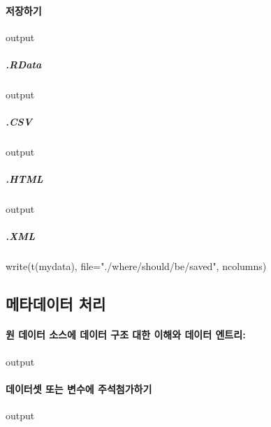 \documentclass{book}
\begin{document}
% 
\paragraph{저장하기}
\begin{Schunk}
\begin{Soutput}
output
\end{Soutput}
\end{Schunk}
\subparagraph{.RData}
\begin{Schunk}
\begin{Soutput}
output
\end{Soutput}
\end{Schunk}
\subparagraph{.CSV}
\begin{Schunk}
\begin{Soutput}
output
\end{Soutput}
\end{Schunk}
\subparagraph{.HTML}
\begin{Schunk}
\begin{Soutput}
output
\end{Soutput}
\end{Schunk}
\subparagraph{.XML}
\begin{Schunk}
\begin{Soutput}
write(t(mydata), file="./where/should/be/saved", ncolumns)
\end{Soutput}
\end{Schunk}

\subsection{메타데이터 처리}
\paragraph{원 데이터 소스에 데이터 구조 대한 이해와 데이터 엔트리: }
\begin{Schunk}
\begin{Soutput}
output
\end{Soutput}
\end{Schunk}

\paragraph{데이터셋 또는 변수에 주석첨가하기}
\begin{Schunk}
\begin{Soutput}
output
\end{Soutput}
\end{Schunk}
\end{document}
